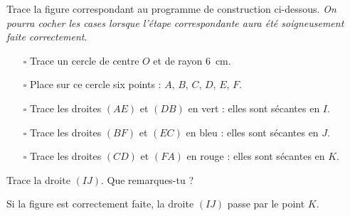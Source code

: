 \begin{myenumerate}
\item Trace la figure correspondant au programme de construction
ci-dessous. {\em On pourra cocher les cases lorsque l'étape
correspondante aura été soigneusement faite correctement}.
\begin{itemize}
\item[$\square$] Trace un cercle de centre $O$ et de rayon 6~cm.
\item[$\square$] Place sur ce cercle six  points : $A$, $B$, $C$, $D$,
$E$, $F$.
\item[$\square$] Trace les droites $(AE)$ et $(DB)$ en vert : elles
sont sécantes en $I$.
\item[$\square$] Trace les droites $(BF)$ et $(EC)$ en bleu : elles
sont sécantes en $J$.
\item[$\square$] Trace les droites $(CD)$ et $(FA)$ en rouge : elles
sont sécantes en $K$.
\end{itemize}
\item Trace la droite $(IJ)$. Que remarques-tu ?
\end{myenumerate}
\begin{myenumerate}
  \setcounter{enumi}{1}
\item Si la figure est correctement faite, la droite $(IJ)$ passe par le point $K$.
\end{myenumerate}